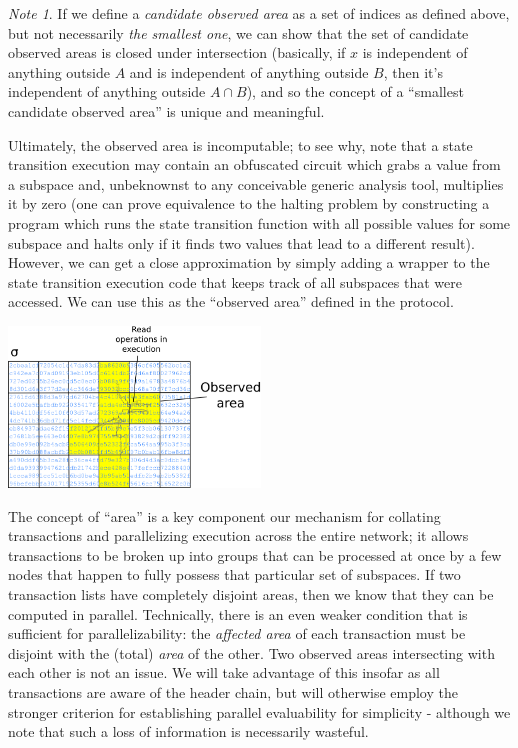 \documentclass[11pt,a4paper]{article}
\theoremstyle{plain}
\theoremstyle{definition}
\theoremstyle{remark}
\newtheorem*{note}{Note}
\begin{document}
\begin{note}
If we define a \emph{candidate observed area} as a set of indices as defined above, but not necessarily \emph{the smallest one}, we can show that the set of candidate observed areas is closed under intersection (basically, if $x$ is independent of anything outside $A$ and is independent of anything outside $B$, then it's independent of anything outside $A \cap B$), and so the concept of a ``smallest candidate observed area'' is unique and meaningful.

Ultimately, the observed area is incomputable; to see why, note that a state transition execution may contain an obfuscated circuit which grabs a value from a subspace and, unbeknownst to any conceivable generic analysis tool, multiplies it by zero (one can prove equivalence to the halting problem by constructing a program which runs the state transition function with all possible values for some subspace and halts only if it finds two values that lead to a different result). However, we can get a close approximation by simply adding a wrapper to the state transition execution code that keeps track of all subspaces that were accessed. We can use this as the ``observed area'' defined in the protocol.
\end{note}

\begin{center}
\includegraphics[width=190pt]{subspace3.png}
\end{center}

The concept of ``area'' is a key component our mechanism for collating transactions and parallelizing execution across the entire network; it allows transactions to be broken up into groups that can be processed at once by a few nodes that happen to fully possess that particular set of subspaces. If two transaction lists have completely disjoint areas, then we know that they can be computed in parallel. Technically, there is an even weaker condition that is sufficient for parallelizability: the \emph{affected area} of each transaction must be disjoint with the (total) \emph{area} of the other. Two observed areas intersecting with each other is not an issue. We will take advantage of this insofar as all transactions are aware of the header chain, but will otherwise employ the stronger criterion for establishing parallel evaluability for simplicity - although we note that such a loss of information is necessarily wasteful.
\end{document}
